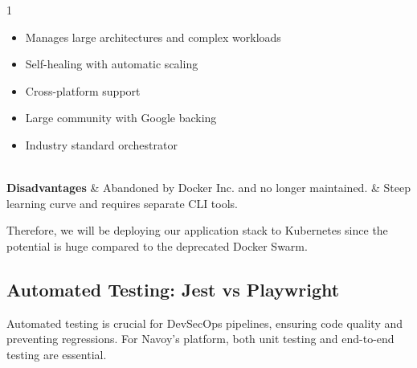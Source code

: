 \begin{table}[H]
\begin{tabularx}{1\textwidth}
\begin{itemize}[leftmargin=*, topsep=0pt, itemsep=1pt, parsep=2pt]
            \item Manages large architectures and complex workloads
            \item Self-healing with automatic scaling
            \item Cross-platform support
            \item Large community with Google backing
            \item Industry standard orchestrator
        \end{itemize}                                   \\
        \hline
        \textbf {Disadvantages}             & \noindent Abandoned by Docker Inc. and no longer maintained.                                                                                                                                                                                                                       & \noindent Steep learning curve and requires separate CLI tools. \\
        \hline
    \end{tabularx}
\end{table}
Therefore, we will be deploying our application stack to Kubernetes since the potential is huge compared to the deprecated Docker Swarm.

\subsection{Automated Testing: Jest vs Playwright}
Automated testing is crucial for DevSecOps pipelines, ensuring code quality and preventing regressions. For Navoy's platform, both unit testing and end-to-end testing are essential.


